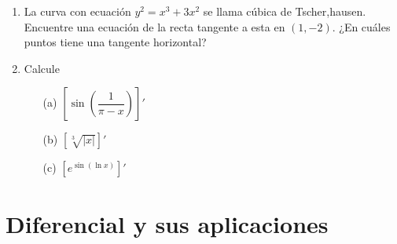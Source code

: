 \documentclass[10pt,twoside]{SelfArx} %
\begin{document}
\begin{enumerate}
	\item	La curva con ecuación $ y^{2}=x^{3}+3x^{2} $ se llama cúbica de Tscher,hausen. Encuentre una ecuación de la recta tangente a esta en $ (1,-2) $. ¿En cuáles puntos tiene una tangente horizontal?
	
	\item	Calcule
	\begin{enumerate}
		\item[(a)]	$ \left [ \sin\left (\dfrac{1}{\pi-x}\right )\right ]' $
		\item[(b)]	$ \left [ \sqrt[3]{|x|}\right ]' $
		
		\item[(c)]	$ \left [ e^{\sin(\ln x)}\right ]' $
	\end{enumerate}
	
	
\end{enumerate}


 \section{Diferencial y sus aplicaciones}
\end{document}
